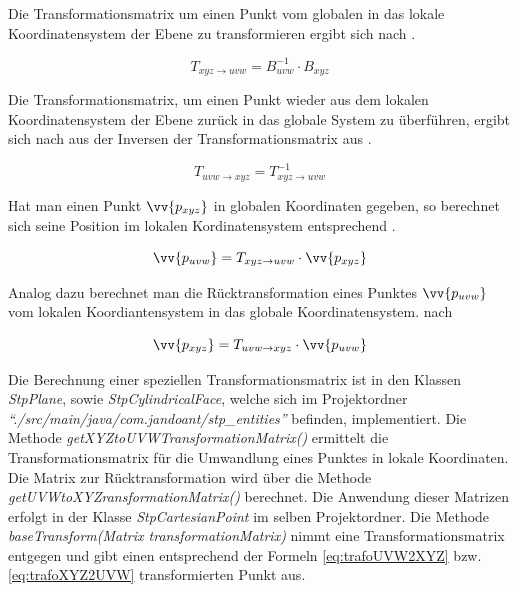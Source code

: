 Die Transformationsmatrix um einen Punkt vom globalen in das lokale Koordinatensystem der Ebene zu transformieren ergibt sich nach .

\begin{equation}\label{eq:trafoXYZ2UVW}
T_{xyz \rightarrow uvw} = B_{uvw}^{-1} \cdot B_{xyz}  
\end{equation}   

Die Transformationsmatrix, um einen Punkt wieder aus dem lokalen Koordinatensystem der Ebene zurück in das globale System zu überführen, ergibt sich nach  aus der Inversen der Transformationsmatrix aus .

\begin{equation}\label{eq:trafoUVW2XYZ}
T_{uvw \rightarrow xyz} = T_{xyz \rightarrow uvw}^{-1} 
\end{equation}   

Hat man einen Punkt $\vv{p_{xyz}}$ in globalen Koordinaten gegeben, so berechnet sich seine Position im lokalen Kordinatensystem entsprechend . 

\begin{equation}\label{eq:pxyz2puvw}
\vv{p_{uvw}}=T_{xyz \rightarrow uvw} \cdot \vv{p_{xyz}}
\end{equation}

Analog dazu berechnet man die Rücktransformation eines Punktes $\vv{p_{uvw}}$ vom lokalen Koordiantensystem in das globale Koordinatensystem. nach 
  
\begin{equation}\label{eq:trafoUVW2XYZ}
\vv{p_{xyz}}=T_{uvw \rightarrow xyz} \cdot \vv{p_{uvw}}
\end{equation}

Die Berechnung einer speziellen Transformationsmatrix ist in den Klassen \textit{StpPlane}, sowie \textit{StpCylindricalFace}, welche sich im Projektordner \textit{"`./src/main/java/com.jandoant/stp\_entities"'} befinden, implementiert. Die Methode \textit{getXYZtoUVWTransformationMatrix()} ermittelt die Transformationsmatrix für die Umwandlung eines Punktes in lokale Koordinaten. Die Matrix zur Rücktransformation wird über die Methode \textit{getUVWtoXYZransformationMatrix()} berechnet. 
Die Anwendung dieser Matrizen erfolgt in der Klasse \textit{StpCartesianPoint} im selben Projektordner. Die Methode \textit{baseTransform(Matrix transformationMatrix)} nimmt eine Transformationsmatrix entgegen und gibt einen entsprechend der Formeln \ref{eq:trafoUVW2XYZ} bzw. \ref{eq:trafoXYZ2UVW} transformierten Punkt aus. 

